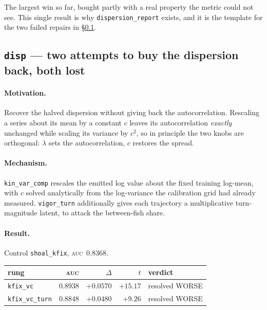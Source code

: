\documentclass[11pt,a4paper]{article}
\newcommand{\lose}[1]{\textcolor{losec}{#1}}
\newcommand{\auc}{\textsc{auc}}
\newcommand{\code}[1]{\texttt{\small #1}}
\begin{document}
\begin{takeaway}
The largest win so far, bought partly with a real property the metric could not see. This
single result is why \code{dispersion\_report} exists, and it is the template for the two
failed repairs in \S\ref{sec:disp}.
\end{takeaway}

\subsection{\texttt{disp} --- two attempts to buy the dispersion back, both lost}\label{sec:disp}

\paragraph{Motivation.} Recover the halved dispersion without giving back the
autocorrelation. Rescaling a series about its mean by a constant $c$ leaves its
autocorrelation \emph{exactly} unchanged while scaling its variance by $c^2$, so in
principle the two knobs are orthogonal: $\lambda$ sets the autocorrelation, $c$ restores
the spread.

\paragraph{Mechanism.} \code{kin\_var\_comp} rescales the emitted log value about the
fixed training log-mean, with $c$ solved analytically from the log-variance the
calibration grid had already measured. \code{vigor\_turn} additionally gives each
trajectory a multiplicative turn-magnitude latent, to attack the between-fish share.

\paragraph{Result.} Control \code{shoal\_kfix}, \auc\ $0.8368$.
\begin{center}\small
\begin{tabular}{lrrrl}
\toprule
rung & \auc{} & $\Delta$ & $t$ & verdict \\
\midrule
\code{kfix\_vc}      & $0.8938$ & $+0.0570$ & $+15.17$ & \lose{resolved WORSE} \\
\code{kfix\_vc\_turn}& $0.8848$ & $+0.0480$ & $+9.26$  & \lose{resolved WORSE} \\
\bottomrule
\end{tabular}
\end{center}
\end{document}
